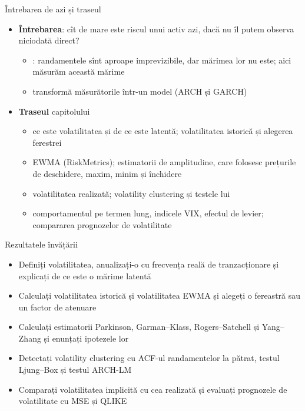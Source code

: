 \begin{frame}{Întrebarea de azi și traseul}
\itemsize{\small}
\begin{itemize}
    \item \textbf{Întrebarea}: cît de mare este riscul unui activ azi, dacă nu îl putem observa niciodată direct?
    \begin{itemize}
        \item {}: randamentele sînt aproape imprevizibile, dar mărimea lor nu este; aici măsurăm această mărime
        \item {} transformă măsurătorile într-un model (ARCH și GARCH)
    \end{itemize}
    \item \textbf{Traseul} capitolului
    \begin{itemize}
        \item ce este volatilitatea și de ce este latentă; volatilitatea istorică și alegerea ferestrei
        \item EWMA (RiskMetrics); estimatorii de amplitudine, care folosesc prețurile de deschidere, maxim, minim și închidere
        \item volatilitatea realizată; volatility clustering și testele lui
        \item comportamentul pe termen lung, indicele VIX, efectul de levier; compararea prognozelor de volatilitate
    \end{itemize}
\end{itemize}
\end{frame}

\begin{frame}{Rezultatele învățării}
\itemsize{\small}
\begin{itemize}
    \item Definiți volatilitatea, anualizați-o cu frecvența reală de tranzacționare și explicați de ce este o mărime latentă
    \item Calculați volatilitatea istorică și volatilitatea EWMA și alegeți o fereastră sau un factor de atenuare
    \item Calculați estimatorii Parkinson, Garman--Klass, Rogers--Satchell și Yang--Zhang și enunțați ipotezele lor
    \item Detectați volatility clustering cu ACF-ul randamentelor la pătrat, testul Ljung--Box și testul ARCH-LM
    \item Comparați volatilitatea implicită cu cea realizată și evaluați prognozele de volatilitate cu MSE și QLIKE
\end{itemize}
\end{frame}

